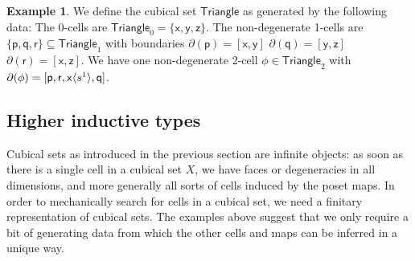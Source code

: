 \documentclass[11pt]{article}
\theoremstyle{definition}
\newtheorem{example}{Example}
\newcommand{\mlist}[1]{[ {#1} ]}
\newcommand{\smap}[1]{s^{{#1}}}
\newcommand{\dmap}[2]{d^{({#1} , {#2})}}
\newcommand{\cont}[2]{\ensuremath{ \ifthenelse{\equal{#2}{}}{#1}{{#1}\langle{#2}\rangle}} }
\newcommand{\cset}[1]{\ensuremath{\mathsf{{#1}}}}
\newcommand{\boundary}[1]{\partial({#1})}
\begin{document}
\begin{example}\label{exp:triangle}
  We define the cubical set $\cset{Triangle}$ as generated by the following
  data: The 0-cells are $\cset{Triangle}_0 = \{ \cset{x} , \cset{y} , \cset{z}
  \}$. The non-degenerate 1-cells are $\{ \cset{p} ,
  \cset{q} , \cset{r} \} \subseteq \cset{Triangle}_1$ with boundaries
  $\boundary{\cset{p}} = \mlist{ \cset{x} , \cset{y}}$
  $\boundary{\cset{q}} = \mlist{ \cset{y} , \cset{z}}$
  $\boundary{\cset{r}} = \mlist{ \cset{x} , \cset{z}}$.
  We have one non-degenerate 2-cell $\cset{\phi} \in \cset{Triangle}_2$ with
  $\boundary{\cset{\phi}} = \mlist{\cset{p} , \cset{r} , \cont{\cset{x}}{\smap{1}}  ,\cset{q}}$.
  

\end{example}



\subsection{Higher inductive types}
\label{ssec:hits}

Cubical sets as introduced in the previous section are infinite objects:
as soon as there is a single cell in a cubical set $X$, we have faces or
degeneracies in all dimensions, and more generally all sorts of cells induced by
the poset maps. In order to mechanically search for cells in a cubical set, we
need a finitary representation of cubical sets. The examples above suggest that
we only require a bit of generating data from which the other cells and maps can
be inferred in a unique way.

\end{document}
